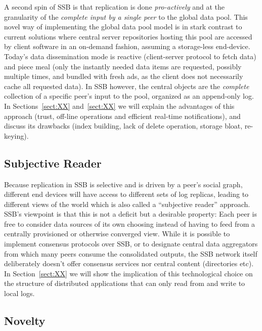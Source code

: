 \documentclass[sigconf]{acmart}
\begin{document}
A second spin of SSB is that replication is done {\em pro-actively} and
at the granularity of the {\em complete input by a single peer} to the
global data pool. This novel way of implementing the global data pool
model is in stark contrast to current solutions where central server
repositories hosting this pool are accessed by client software in an
on-demand fashion, assuming a storage-less end-device. Today's data
dissemination mode is reactive (client-server protocol to fetch data)
and piece meal (only the instantly needed data items are requested,
possibly multiple times, and bundled with fresh ads, as the client
does not necessarily cache all requested data). In SSB however, the
central objects are the {\em complete} collection of a specific peer's
input to the pool, organized as an append-only log. In
Sections~\ref{sect:XX} and~\ref{sect:XX} we will explain the
advantages of this approach (trust, off-line operations and efficient
real-time notifications), and discuss its drawbacks (index building,
lack of delete operation, storage bloat, re-keying).

\subsection*{Subjective Reader}

Because replication in SSB is selective and is driven by a peer's
social graph, different end devices will have access to different sets
of log replicas, leading to different views of the world which is also
called a ``subjective reader'' approach. SSB's viewpoint is that this
is not a deficit but a desirable property: Each peer is free to
consider data sources of its own choosing instead of having to feed
from a centrally provisioned or otherwise converged view. While it is
possible to implement consensus protocols over SSB, or to designate
central data aggregators from which many peers consume the
consolidated outputs, the SSB network itself deliberately doesn't
offer consensus services nor central content (directories etc). In
Section~\ref{sect:XX} we will show the implication of this
technological choice on the structure of distributed applications that
can only read from and write to local logs.

\subsection*{Novelty}
\end{document}
